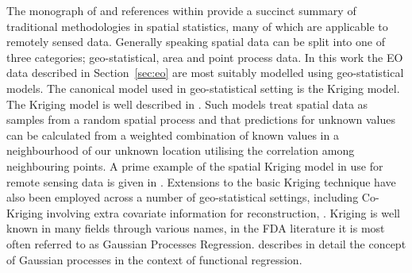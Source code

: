The monograph of \cite{cressie_statistics_2010} and references within provide a succinct summary of traditional methodologies in spatial statistics, many of which are applicable to remotely sensed data.
Generally speaking spatial data can be split into one of three categories; geo-statistical, area and point process data.
In this work the EO data described in Section~\ref{sec:eo}  are most suitably modelled using geo-statistical models.
The canonical model used in geo-statistical setting is the Kriging model.
The Kriging model is well described in \cite{stein_interpolation_1999}.
Such models treat spatial data as samples from a random spatial process and that predictions for unknown values can be calculated from a weighted combination of known values in a neighbourhood of our unknown location utilising the correlation among neighbouring points.
A prime example of the spatial Kriging model in use for remote sensing data is given in \cite{rossi_kriging_1994}.
Extensions to the basic Kriging technique have also been employed across a number of geo-statistical settings, including Co-Kriging involving extra covariate information for reconstruction, \cite{zhang_restoration_2009}.
Kriging is well known in many fields through various names, in the FDA literature it is most often referred to as Gaussian Processes Regression.
\citeauthor{shi_gaussian_2011} describes in detail the concept of Gaussian processes in the context of functional regression. 

